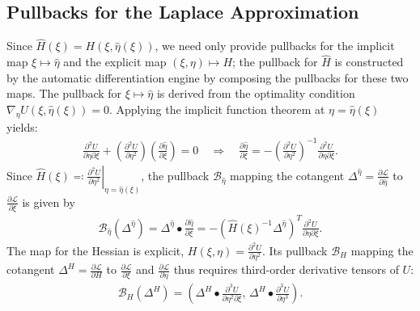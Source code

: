 \documentclass{article}
\begin{document}
\subsection{Pullbacks for the Laplace Approximation}

Since $\hat{H}(\xi) = H(\xi, \hat{\eta}(\xi))$, we need only provide pullbacks for the implicit map $\xi \mapsto \hat{\eta}$ and the explicit map $(\xi, \eta) \mapsto H$;
the pullback for $\hat{H}$ is constructed by the automatic differentiation engine by composing the pullbacks for these two maps.
The pullback for $\xi \mapsto \hat{\eta}$ is derived from the optimality condition $\nabla_\eta U(\xi, \hat{\eta}(\xi)) = 0$.
Applying the implicit function theorem at $\eta = \hat{\eta}(\xi)$ yields:
%
\begin{align}
  \frac{\partial^2 U}{\partial \eta \partial \xi} + \left(\frac{\partial^2 U}{\partial \eta^2}\right) \left(\frac{\partial \hat{\eta}}{\partial \xi}\right) = 0
  \quad \Rightarrow \quad
  \frac{\partial \hat{\eta}}{\partial \xi} = -\left(\frac{\partial^2 U}{\partial \eta^2}\right)^{-1} \frac{\partial^2 U}{\partial \eta \partial \xi}.
\end{align}
%
Since $\hat{H}(\xi) \eqqcolon \left. \frac{\partial^2 U}{\partial \eta^2} \right|_{\eta=\hat{\eta}(\xi)}$, the pullback $\mathcal{B}_{\hat{\eta}}$ mapping the cotangent $\Delta^{\hat{\eta}} = \frac{\partial \mathcal{L}}{\partial \hat{\eta}}$ to $\frac{\partial \mathcal{L}}{\partial \xi}$ is given by
%
\begin{align}\label{eq:pullback-eta-hat}
  \mathcal{B}_{\hat{\eta}}(\Delta^{\hat{\eta}})
  = \Delta^{\hat{\eta}} \bullet \frac{\partial \hat{\eta}}{\partial \xi}
  = -\left( \hat{H}(\xi)^{-1} \Delta^{\hat{\eta}} \right)^{T} \frac{\partial^2 U}{\partial \eta \partial \xi}.
\end{align}
%
The map for the Hessian is explicit, $H(\xi, \eta) = \frac{\partial^2 U}{\partial \eta^2}$.
Its pullback $\mathcal{B}_H$ mapping the cotangent $\Delta^H = \frac{\partial \mathcal{L}}{\partial H}$ to $\frac{\partial \mathcal{L}}{\partial \xi}$ and $\frac{\partial \mathcal{L}}{\partial \eta}$ thus requires third-order derivative tensors of $U$:
%
\begin{align}\label{eq:pullback-H}
  \mathcal{B}_H(\Delta^H) = \left( \Delta^H \bullet \frac{\partial^3 U}{\partial \eta^2 \partial \xi}, \, \Delta^H \bullet \frac{\partial^3 U}{\partial \eta^3} \right).
\end{align}
\end{document}
